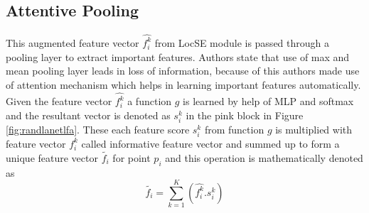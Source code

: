 \subsection{Attentive Pooling}
This augmented feature vector $\hat{f_i^k}$ from LocSE module is passed through a pooling layer to extract important features.
Authors state that use of max and mean pooling layer leads in loss of information, because of this authors made use of attention mechanism which helps in learning important features automatically.
Given the feature vector $\hat{f_i^k}$ a function $g$ is learned by help of MLP and softmax and the resultant vector is denoted as $s_i^k$ in the pink block in Figure \ref{fig:randlanetlfa}.
These each feature score $s_i^k$ from function $g$ is multiplied with feature vector $f_i^k$ called informative feature vector and summed up to form a unique feature vector $\tilde{f_i}$ for point $p_i$ and this operation is mathematically denoted as
$$
\tilde{f_i}= \sum_{k=1}^K (\hat{f_i^k}.s_i^k)
$$

